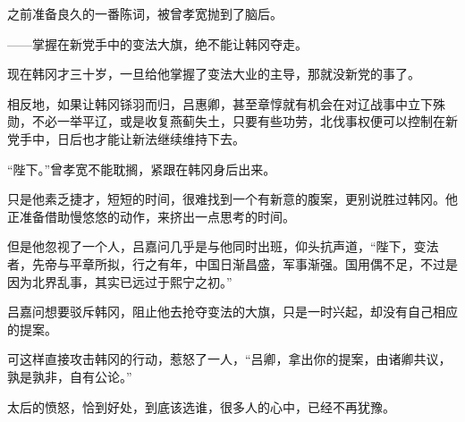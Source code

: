 之前准备良久的一番陈词，被曾孝宽抛到了脑后。

——掌握在新党手中的变法大旗，绝不能让韩冈夺走。

现在韩冈才三十岁，一旦给他掌握了变法大业的主导，那就没新党的事了。

相反地，如果让韩冈铩羽而归，吕惠卿，甚至章惇就有机会在对辽战事中立下殊勋，不必一举平辽，或是收复燕蓟失土，只要有些功劳，北伐事权便可以控制在新党手中，日后也才能让新法继续维持下去。

“陛下。”曾孝宽不能耽搁，紧跟在韩冈身后出来。

只是他素乏捷才，短短的时间，很难找到一个有新意的腹案，更别说胜过韩冈。他正准备借助慢悠悠的动作，来挤出一点思考的时间。

但是他忽视了一个人，吕嘉问几乎是与他同时出班，仰头抗声道，“陛下，变法者，先帝与平章所拟，行之有年，中国日渐昌盛，军事渐强。国用偶不足，不过是因为北界乱事，其实已远过于熙宁之初。”

吕嘉问想要驳斥韩冈，阻止他去抢夺变法的大旗，只是一时兴起，却没有自己相应的提案。

可这样直接攻击韩冈的行动，惹怒了一人，“吕卿，拿出你的提案，由诸卿共议，孰是孰非，自有公论。”

太后的愤怒，恰到好处，到底该选谁，很多人的心中，已经不再犹豫。

